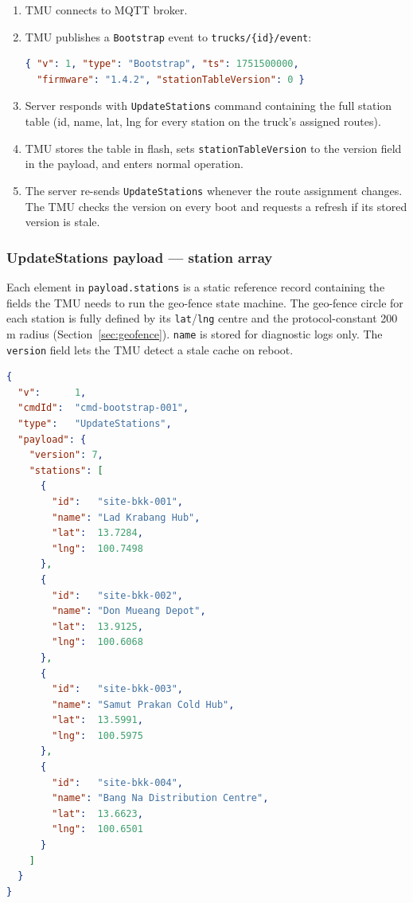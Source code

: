 \documentclass{article}
\begin{document}
\begin{enumerate}[leftmargin=*, label=\textbf{Step \arabic*.}]
    \item TMU connects to MQTT broker.
    \item TMU publishes a \texttt{Bootstrap} event to \texttt{trucks/\{id\}/event}:
    \begin{lstlisting}[language=json]
{ "v": 1, "type": "Bootstrap", "ts": 1751500000,
  "firmware": "1.4.2", "stationTableVersion": 0 }
    \end{lstlisting}
    \item Server responds with \texttt{UpdateStations} command containing the
          full station table (id, name, lat, lng for every station on the
          truck's assigned routes).
    \item TMU stores the table in flash, sets \texttt{stationTableVersion}
          to the version field in the payload, and enters normal operation.
    \item The server re-sends \texttt{UpdateStations} whenever the route
          assignment changes. The TMU checks the version on every boot and
          requests a refresh if its stored version is stale.
\end{enumerate}

\subsubsection*{UpdateStations payload --- station array}

Each element in \texttt{payload.stations} is a static reference record
containing the fields the TMU needs to run the geo-fence state machine.
The geo-fence circle for each station is fully defined by its
\texttt{lat}/\texttt{lng} centre and the protocol-constant 200 m radius
(Section~\ref{sec:geofence}). \texttt{name} is stored for diagnostic
logs only. The \texttt{version} field lets the TMU detect a stale cache
on reboot.

\begin{lstlisting}[language=json, caption=Topic: trucks/truck-bkk-007/cmd | QoS 1 (server $\to$ truck)]
{
  "v":      1,
  "cmdId":  "cmd-bootstrap-001",
  "type":   "UpdateStations",
  "payload": {
    "version": 7,
    "stations": [
      {
        "id":   "site-bkk-001",
        "name": "Lad Krabang Hub",
        "lat":  13.7284,
        "lng":  100.7498
      },
      {
        "id":   "site-bkk-002",
        "name": "Don Mueang Depot",
        "lat":  13.9125,
        "lng":  100.6068
      },
      {
        "id":   "site-bkk-003",
        "name": "Samut Prakan Cold Hub",
        "lat":  13.5991,
        "lng":  100.5975
      },
      {
        "id":   "site-bkk-004",
        "name": "Bang Na Distribution Centre",
        "lat":  13.6623,
        "lng":  100.6501
      }
    ]
  }
}
\end{lstlisting}
\end{document}
